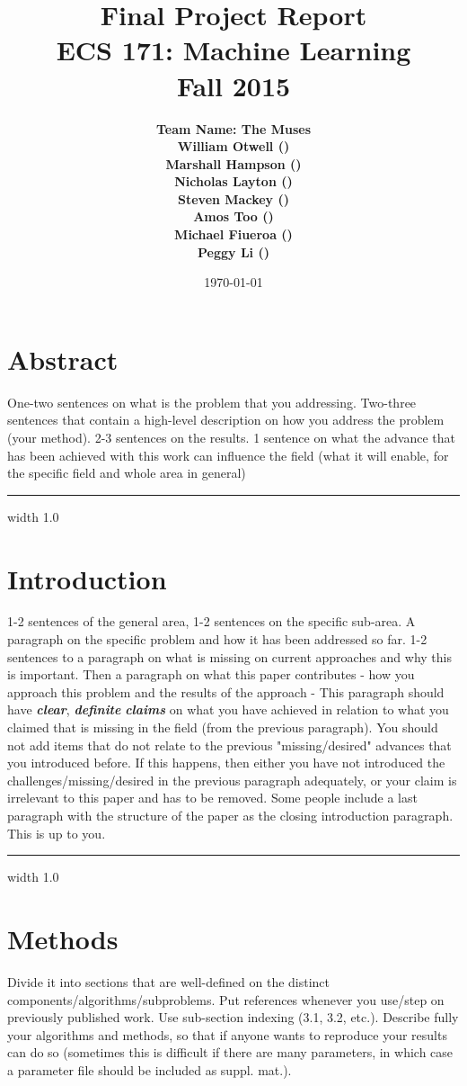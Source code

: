 \documentclass[11pt]{article}
\title{\vspace{-3ex}\bf Final Project Report\\[2ex] 
       \normalsize ECS 171: Machine Learning\\Fall 2015}
\date{\today}
\author{\bf Team Name: The Muses\\ \bf William Otwell ()\\ \bf Marshall Hampson ()\\ \bf Nicholas Layton ()\\ \bf Steven Mackey ()\\ \bf Amos Too ()\\ \bf Michael Fiueroa ()\\ \bf Peggy Li ()}
\newcommand{\horizontalLine}{
	\begin{center}
		\hrule width 1.0\textwidth
	\end{center}
}
\begin{document}
\maketitle
\pagebreak
\tableofcontents
\pagebreak

\section{Abstract}
\label{sec:abstract}
One-two sentences on what is the problem that you addressing. Two-three sentences
that contain a high-level description on how you address the problem (your method). 2-3 sentences
on the results. 1 sentence on what the advance that has been achieved with this work
can influence the field (what it will enable, for the specific field and whole area in general)

\horizontalLine
\section{Introduction}
\label{sec:introduction}
1-2 sentences of the general area, 1-2 sentences on the specific sub-area. A paragraph
on the specific problem and how it has been addressed so far. 1-2 sentences to a paragraph
on what is missing on current approaches and why this is important.
Then a paragraph on what this paper contributes - how you approach this problem and the
results of the approach - This paragraph should have \textbf{\textit{clear}}, \textbf{\textit{definite}} \textbf{\textit{claims}} on what you have
achieved in relation to what you claimed that is missing in the field (from the previous paragraph).
You should not add items that do not relate to the previous "missing/desired" advances
that you introduced before. If this happens, then either you have not introduced the challenges/missing/desired
in the previous paragraph adequately, or your claim is irrelevant to this
paper and has to be removed.
Some people include a last paragraph with the structure of the paper as the closing introduction
paragraph. This is up to you.

\horizontalLine
\section{Methods}
\label{sec:methods}
 Divide it into sections that are well-defined on the distinct components/algorithms/subproblems.
 Put references whenever you use/step on previously published work. Use sub-section
 indexing (3.1, 3.2, etc.). Describe fully your algorithms and methods, so that if anyone wants to
 reproduce your results can do so (sometimes this is difficult if there are many parameters, in
 which case a parameter file should be included as suppl. mat.).
\end{document}
